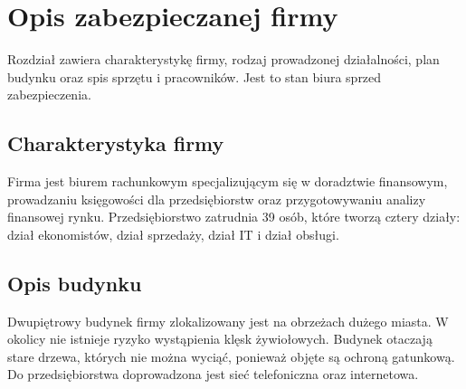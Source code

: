 \newpage\section{Opis zabezpieczanej firmy}
Rozdział zawiera charakterystykę firmy, rodzaj prowadzonej działalności, plan budynku oraz spis sprzętu i pracowników. Jest to stan biura sprzed zabezpieczenia.

\subsection*{Charakterystyka firmy}
Firma jest biurem rachunkowym specjalizującym się w doradztwie \linebreak finansowym, prowadzaniu księgowości dla przedsiębiorstw oraz przygotowywaniu analizy finansowej rynku. Przedsiębiorstwo zatrudnia 39 osób, które tworzą cztery działy: dział ekonomistów, dział sprzedaży, dział IT i dział obsługi.

\subsection{Opis budynku}
Dwupiętrowy budynek firmy zlokalizowany jest na obrzeżach dużego miasta. W okolicy nie istnieje ryzyko wystąpienia klęsk żywiołowych. \linebreak Budynek otaczają stare drzewa, których nie można wyciąć, ponieważ \linebreak objęte są ochroną gatunkową. Do przedsiębiorstwa doprowadzona jest sieć \linebreak telefoniczna oraz internetowa.
